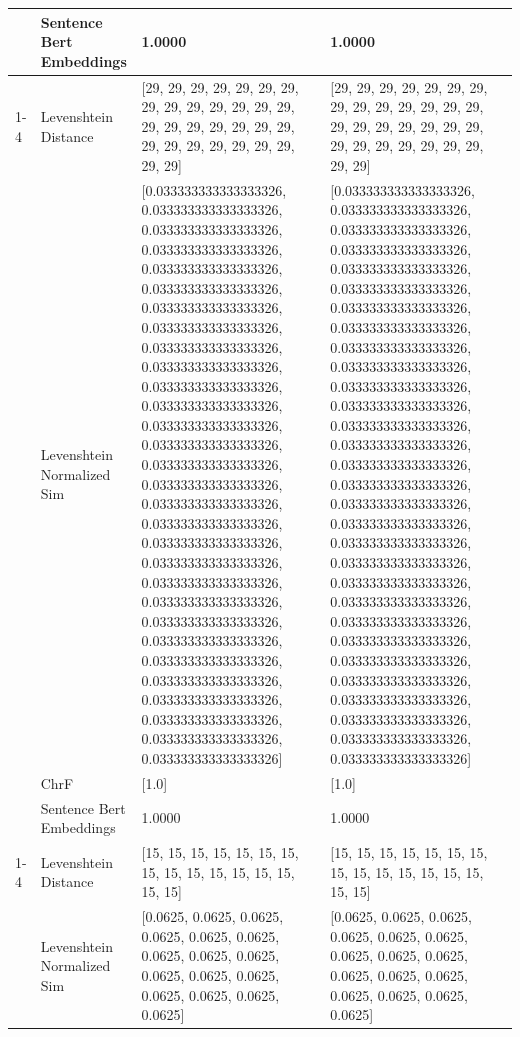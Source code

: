 \begin{tabular}{llll}
 & Sentence Bert Embeddings & 1.0000 & 1.0000 \\
\cline{1-4}
\multirow[t]{4}{*}{Omwana bwe'ntumu nigo orenyora.} & Levenshtein Distance & [29, 29, 29, 29, 29, 29, 29, 29, 29, 29, 29, 29, 29, 29, 29, 29, 29, 29, 29, 29, 29, 29, 29, 29, 29, 29, 29, 29, 29, 29] & [29, 29, 29, 29, 29, 29, 29, 29, 29, 29, 29, 29, 29, 29, 29, 29, 29, 29, 29, 29, 29, 29, 29, 29, 29, 29, 29, 29, 29, 29] \\
 & Levenshtein Normalized Sim & [0.033333333333333326, 0.033333333333333326, 0.033333333333333326, 0.033333333333333326, 0.033333333333333326, 0.033333333333333326, 0.033333333333333326, 0.033333333333333326, 0.033333333333333326, 0.033333333333333326, 0.033333333333333326, 0.033333333333333326, 0.033333333333333326, 0.033333333333333326, 0.033333333333333326, 0.033333333333333326, 0.033333333333333326, 0.033333333333333326, 0.033333333333333326, 0.033333333333333326, 0.033333333333333326, 0.033333333333333326, 0.033333333333333326, 0.033333333333333326, 0.033333333333333326, 0.033333333333333326, 0.033333333333333326, 0.033333333333333326, 0.033333333333333326, 0.033333333333333326] & [0.033333333333333326, 0.033333333333333326, 0.033333333333333326, 0.033333333333333326, 0.033333333333333326, 0.033333333333333326, 0.033333333333333326, 0.033333333333333326, 0.033333333333333326, 0.033333333333333326, 0.033333333333333326, 0.033333333333333326, 0.033333333333333326, 0.033333333333333326, 0.033333333333333326, 0.033333333333333326, 0.033333333333333326, 0.033333333333333326, 0.033333333333333326, 0.033333333333333326, 0.033333333333333326, 0.033333333333333326, 0.033333333333333326, 0.033333333333333326, 0.033333333333333326, 0.033333333333333326, 0.033333333333333326, 0.033333333333333326, 0.033333333333333326, 0.033333333333333326] \\
 & ChrF & [1.0] & [1.0] \\
 & Sentence Bert Embeddings & 1.0000 & 1.0000 \\
\cline{1-4}
\multirow[t]{4}{*}{Amanyira nigo are oboigoro.} & Levenshtein Distance & [15, 15, 15, 15, 15, 15, 15, 15, 15, 15, 15, 15, 15, 15, 15, 15] & [15, 15, 15, 15, 15, 15, 15, 15, 15, 15, 15, 15, 15, 15, 15, 15] \\
 & Levenshtein Normalized Sim & [0.0625, 0.0625, 0.0625, 0.0625, 0.0625, 0.0625, 0.0625, 0.0625, 0.0625, 0.0625, 0.0625, 0.0625, 0.0625, 0.0625, 0.0625, 0.0625] & [0.0625, 0.0625, 0.0625, 0.0625, 0.0625, 0.0625, 0.0625, 0.0625, 0.0625, 0.0625, 0.0625, 0.0625, 0.0625, 0.0625, 0.0625, 0.0625] \\

\end{tabular}
